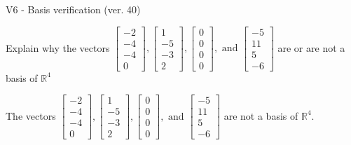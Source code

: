 \begin{exercise}
  \begin{exerciseTitle}V6 - Basis verification (ver. 40)\end{exerciseTitle}
  \begin{exerciseStatement}
    Explain why the vectors \(\left[\begin{array}{r}
-2 \\
-4 \\
-4 \\
0
\end{array}\right] , \left[\begin{array}{r}
1 \\
-5 \\
-3 \\
2
\end{array}\right] , \left[\begin{array}{r}
0 \\
0 \\
0 \\
0
\end{array}\right] , \text{ and } \left[\begin{array}{r}
-5 \\
11 \\
5 \\
-6
\end{array}\right]\) are or are not a basis of \(\mathbb{R}^4\)	


  \end{exerciseStatement}
  \begin{exerciseAnswer}
   The vectors \(\left[\begin{array}{r}
-2 \\
-4 \\
-4 \\
0
\end{array}\right] , \left[\begin{array}{r}
1 \\
-5 \\
-3 \\
2
\end{array}\right] , \left[\begin{array}{r}
0 \\
0 \\
0 \\
0
\end{array}\right] , \text{ and } \left[\begin{array}{r}
-5 \\
11 \\
5 \\
-6
\end{array}\right]\) 
  	 are not  a basis of \(\mathbb{R}^4\).
  


  \end{exerciseAnswer}
\end{exercise}